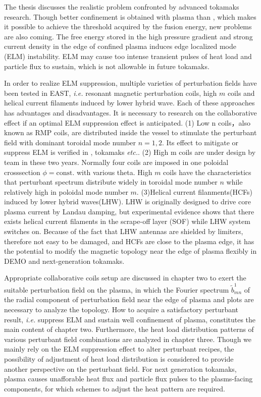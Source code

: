 \begin{eabstract}
  The thesis discusses the realistic problem confronted by advanced tokamaks research. Though better confinement is obtained with \Hmode plasma than \Lmode, which makes it possible to achieve the threshold acquired by the fusion energy, new problems are also coming. The free energy stored in the high pressure gradient and strong current density in the edge of confined plasma induces edge localized mode (ELM) instability. ELM may cause too intense transient pulses of heat load and particle flux to sustain, which is not allowable in future tokamaks.

  In order to realize ELM suppression, multiple varieties of perturbation fields have been tested in EAST, \textit{i.e.} resonant magnetic perturbation coils, high $m$ coils and helical current filaments induced by lower hybrid wave. Each of these approaches has advantages and disadvantages. It is necessary to research on the collaborative effect if an optimal ELM suppression effect is anticipated. (1) Low n coils，also known as RMP coils, are distributed inside the vessel to stimulate the perturbant field with dominant toroidal mode number $n=1,2$. Its effect to mitigate or suppress ELM is verified in \east, \ddd tokamaks \textit{etc.}. (2) High m coils are under design by \east team in these two years. Normally four coils are imposed in one poloidal crosssection $\phi=\text{const.}$ with various theta. High $m$ coils have the characteristics that perturbant spectrum distribute widely in toroidal mode number $n$ while relatively high in poloidal mode number $m$. (3)Helical current filanments(HCFs) induced by lower hybrid waves(LHW). LHW is originally designed to drive core plasma current by Landau damping, but experimental evidence shows that there exists helical current filaments in the scrape-off layer (SOF) while LHW system switches on. Because of the fact that LHW antennas are shielded by limiters, therefore not easy to be damaged, and HCFs are close to the plasma edge, it has the potential to modify the magnetic topology near the edge of plasma flexibly in DEMO and next-generation tokamaks.

  Appropriate collaborative coils setup are discussed in chapter two to exert the suitable perturbation field on the plasma, in which the Fourier spectrum $\tilde{b}^1_{mn}$ of the radial component of perturbation field near the edge of plasma and \Poincare plots are necessary to analyze the topology. How to acquire a satisfactory perturbant result, \textit{i.e.} suppress ELM and sustain well confinement of plasma, constitutes the main content of chapter two. Furthermore, the heat load distribution patterns of various perturbant field combinations are analyzed in chapter three. Though we mainly rely on the ELM suppression effect to alter perturbant recipes, the possibility of adjustment of heat load distribution is considered to provide another perspective on the perturbant field. For next generation tokamaks, \Hmode plasma causes unafforable heat flux and particle flux pulses to the plasms-facing components, for which schemes to adjust the heat pattern are required.
\end{eabstract}

